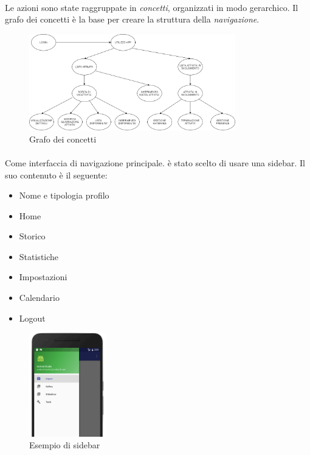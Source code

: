 \documentclass[11pt,a4paper,english]{article}
\begin{document}
\paragraph{} Le azioni sono state raggruppate in \emph{concetti}, organizzati in modo gerarchico. Il grafo dei concetti è la base per creare la struttura della \emph{navigazione}. 

\begin{figure}[H]
    \centering
    \includegraphics[width=0.8\textwidth]{img/concetti task app.png}
    \caption{Grafo dei concetti}
\end{figure}


\paragraph{} Come interfaccia di navigazione principale. è stato scelto di usare una sidebar. Il suo contenuto è il seguente: 
\begin{itemize}
    \item Nome e tipologia profilo
    \item Home
    \item Storico
    \item Statistiche
    \item Impostazioni
    \item Calendario
    \item Logout
\end{itemize}


\begin{figure}[H]
    \centering
    \includegraphics[width=0.3\textwidth]{img/sidebar-example.png}
    \caption{Esempio di sidebar}
\end{figure}
\end{document}
